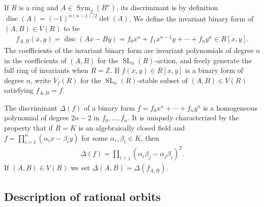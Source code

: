 \documentclass{article} %
\numberwithin{equation}{section}
\DeclareMathOperator{\SL}{SL}
\DeclareMathOperator{\Sym}{Sym}
\newcommand{\Z}{\mathbb{Z}}
\DeclareMathOperator{\disc}{disc}
\begin{document}
If $R$ is a ring and $A\in \Sym_2(R^n)$, its discriminant is by definition $\disc(A) = (-1)^{n(n-1)/2}\det(A)$.
We define the invariant binary form of $(A,B)\in V(R)$ to be
\begin{align*}
    f_{A,B}(x,y) = \disc(Ax-By)  = f_0 x^n + f_1 x^{n-1}y + \cdots + f_ny^n \in R[x,y].
\end{align*}
The coefficients of the invariant binary form are invariant polynomials of degree $n$ in the coefficients of $(A,B)$ for the $\SL_n(R)$-action, and freely generate the full ring of invariants when $R = \Z$.
If $f(x,y)\in R[x,y]$ is a binary form of degree $n$, write $V_f(R)$ for the $\SL_n(R)$-stable subset of $(A,B) \in V(R)$ satisfying $f_{A,B} = f$. 



The discriminant $\Delta(f)$ of a binary form $f = f_0x^n + \cdots +f_ny^n$ is a homogeneous polynomial of degree $2n-2$ in $f_0, \dots,f_n$.
It is uniquely characterized by the property that if $R=K$ is an algebraically closed field and $f = \prod_{i=1}^n(\alpha_ix-\beta_i y)$ for some $\alpha_i, \beta_i \in K$, then 
\begin{align*}
    \Delta(f) = \prod_{i< j } (\alpha_i\beta_j - \alpha_j \beta_i)^2.
\end{align*}
If $(A,B)\in V(R)$ we set $\Delta(A,B) = \Delta(f_{A,B})$.



\subsection{Description of rational orbits}\label{subsec_rational_orbits}
\end{document}
